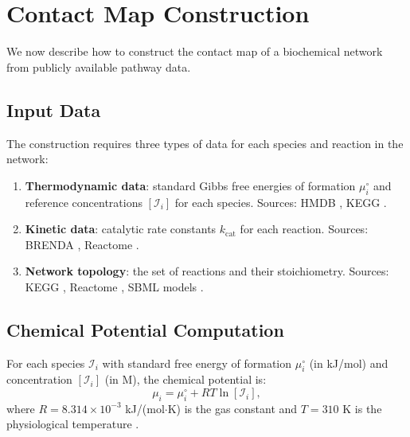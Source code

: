 \documentclass[11pt,twocolumn]{article}
\theoremstyle{plain}
\theoremstyle{definition}
\begin{document}
\section{Contact Map Construction}
\label{sec:construction}

We now describe how to construct the contact map of a biochemical network from
publicly available pathway data.

\subsection{Input Data}

The construction requires three types of data for each species and reaction in
the network:

\begin{enumerate}[label=(\alph*)]
\item \textbf{Thermodynamic data}: standard Gibbs free energies of formation
  $\mu_i^\circ$ and reference concentrations $[\mathcal{I}_i]$ for each species.
  Sources: HMDB \cite{wishart2018hmdb}, KEGG \cite{kanehisa2000kegg}.

\item \textbf{Kinetic data}: catalytic rate constants $k_{\text{cat}}$ for each
  reaction. Sources: BRENDA \cite{schomburg2004brenda}, Reactome
  \cite{jassal2020reactome}.

\item \textbf{Network topology}: the set of reactions and their stoichiometry.
  Sources: KEGG \cite{kanehisa2000kegg}, Reactome \cite{jassal2020reactome},
  SBML models \cite{hucka2003sbml}.
\end{enumerate}

\subsection{Chemical Potential Computation}

For each species $\mathcal{I}_i$ with standard free energy of formation
$\mu_i^\circ$ (in kJ/mol) and concentration $[\mathcal{I}_i]$ (in M), the
chemical potential is:
\begin{equation}\label{eq:mu}
  \mu_i = \mu_i^\circ + RT \ln[\mathcal{I}_i],
\end{equation}
where $R = 8.314 \times 10^{-3}$ kJ/(mol$\cdot$K) is the gas constant and
$T = 310$ K is the physiological temperature \cite{atkins2014physical,
alberty2003thermodynamics}.
\end{document}
